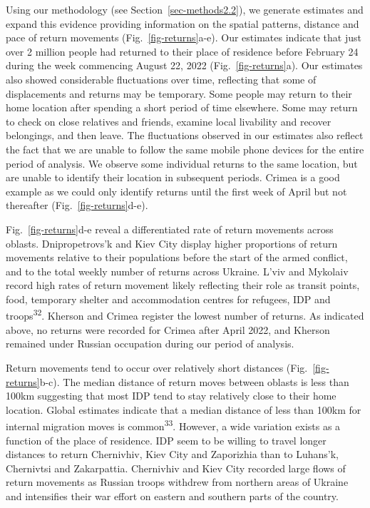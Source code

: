 \documentclass[
  11pt,
]{article}
\begin{document}
Using our methodology (see Section~\ref{sec-methods2.2}), we generate
estimates and expand this evidence providing information on the spatial
patterns, distance and pace of return movements
(Fig.~\ref{fig-returns}a-e). Our estimates indicate that just over 2
million people had returned to their place of residence before February
24 during the week commencing August 22, 2022 (Fig.~\ref{fig-returns}a).
Our estimates also showed considerable fluctuations over time,
reflecting that some of displacements and returns may be temporary. Some
people may return to their home location after spending a short period
of time elsewhere. Some may return to check on close relatives and
friends, examine local livability and recover belongings, and then
leave. The fluctuations observed in our estimates also reflect the fact
that we are unable to follow the same mobile phone devices for the
entire period of analysis. We observe some individual returns to the
same location, but are unable to identify their location in subsequent
periods. Crimea is a good example as we could only identify returns
until the first week of April but not thereafter
(Fig.~\ref{fig-returns}d-e).

Fig.~\ref{fig-returns}d-e reveal a differentiated rate of return
movements across oblasts. Dnipropetrovs'k and Kiev City display higher
proportions of return movements relative to their populations before the
start of the armed conflict, and to the total weekly number of returns
across Ukraine. L'viv and Mykolaiv record high rates of return movement
likely reflecting their role as transit points, food, temporary shelter
and accommodation centres for refugees, IDP and
troops\textsuperscript{32}. Kherson and Crimea register the lowest
number of returns. As indicated above, no returns were recorded for
Crimea after April 2022, and Kherson remained under Russian occupation
during our period of analysis.

Return movements tend to occur over relatively short distances
(Fig.~\ref{fig-returns}b-c). The median distance of return moves between
oblasts is less than 100km suggesting that most IDP tend to stay
relatively close to their home location. Global estimates indicate that
a median distance of less than 100km for internal migration moves is
common\textsuperscript{33}. However, a wide variation exists as a
function of the place of residence. IDP seem to be willing to travel
longer distances to return Chernivhiv, Kiev City and Zaporizhia than to
Luhans'k, Chernivtsi and Zakarpattia. Chernivhiv and Kiev City recorded
large flows of return movements as Russian troops withdrew from northern
areas of Ukraine and intensifies their war effort on eastern and
southern parts of the country.
\end{document}

